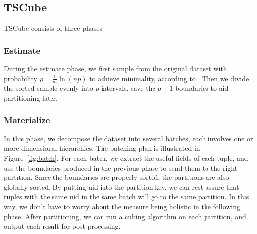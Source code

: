 \documentclass{article}
\begin{document}
\subsection{TSCube}

TSCube consists of three phases.

\subsubsection{Estimate}
During the estimate phase, we first sample from the original dataset with probability $\rho=\frac{1}{m}\ln(np)$ to achieve minimality, according to \cite{tao2013minimal}. Then we divide the sorted sample evenly into $p$ intervals, save the $p - 1$ boundaries to aid partitioning later.

\subsubsection{Materialize}
In this phase, we decompose the dataset into several batches, each involves one or more dimensional hierarchies. The batching plan is illustrated in Figure~\ref{fig:batch}. For each batch, we extract the useful fields of each tuple, and use the boundaries produced in the previous phase to send them to the right partition. Since the boundaries are properly sorted, the partitions are also globally sorted. By putting uid into the partition key, we can rest assure that tuples with the same uid in the same batch will go to the same partition. In this way, we don't have to worry about the measure being holistic in the following phase. After partitioning, we can run a cubing algorithm on each partition, and output each result for post processing.
\end{document}
